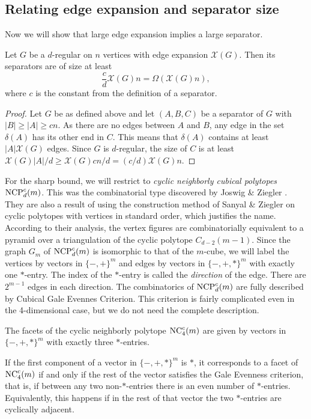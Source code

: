 \subsection{Relating edge expansion and separator size}
Now we will show that large edge expansion implies a large separator.
\begin{lemma}
\label{separatorsize}
Let $G$ be a $d$-regular on $n$ vertices with edge expansion $\mathcal{X}(G)$.
Then its separators are of size at least
\begin{equation}
	\frac{c}{d}\mathcal{X}(G)n = \Omega(\mathcal{X}(G)n),
\end{equation}
where $c$ is the constant from the definition of a separator.
\end{lemma}
\begin{proof}
Let $G$ be as defined above and let $(A,B,C)$ be a separator of $G$ with $|B| \ge |A| \ge cn$.
As there are no edges between $A$ and $B$, any edge in the set $\delta(A)$ has its other end in
$C$. This means that $\delta(A)$ contains at least $|A|\mathcal{X}(G)$ edges. Since $G$ is $d$-regular,
the size of $C$ is at least $\mathcal{X}(G)|A|/d \ge \mathcal{X}(G)cn/d = (c/d)\mathcal{X}(G)n$.  
\end{proof}

For the sharp bound, we will restrict to \textit{cyclic neighborly cubical polytopes} 
 $\textrm{NCP}^c_d(m)$.
This was the combinatorial type discovered by Joswig \& Ziegler \cite{Z62}. They
are also a result of using the construction method of Sanyal \& Ziegler \cite{Z102}
on cyclic polytopes with vertices in standard order, which justifies the name.  According
to their analysis, the vertex figures are combinatorially equivalent to a pyramid over
a triangulation of the cyclic polytope $C_{d-2}(m-1)$. Since the graph $G_m$ of $\textrm{NCP}^c_d(m)$
is isomorphic to that of the $m$-cube, we will label the vertices by vectors in $\{-,+\}^m$ and
edges by vectors in $\{-,+,*\}^m$ with exactly one $*$-entry. The index of the $*$-entry is
called the \textit{direction} of the edge. There are $2^{m-1}$ edges in each direction.
The combinatorics of $\textrm{NCP}^c_d(m)$ are fully described by Cubical Gale Evennes Criterion.
This criterion is fairly complicated even in the 4-dimensional case, but we do not need the 
complete description.

\begin{theorem}
[Part of the Cubical Gale Evenness Criterion, for $d=4$ {\cite[Thm.~18]{Z62}}] 
The facets of the cyclic neighborly polytope $\mathrm{NC}^c_4(m)$ are given by vectors in
$\{-,+,*\}^m$ with exactly three $*$-entries. 

If the first component of a vector in $\{-,+,*\}^m$ is $*$, it corresponds to a facet 
of $\mathrm{NC}^c_4(m)$ if and only if the rest of the vector satisfies the Gale Evenness criterion, 
that is, if between any two non-$*$-entries there is an even number of $*$-entries.
Equivalently, this happens if in the rest of that vector the two $*$-entries are
cyclically adjacent.
\end{theorem}

